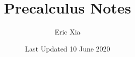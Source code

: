 \documentclass{article}
\title{Precalculus Notes}
\author{Eric Xia}
\date{Last Updated 10 June 2020}
\begin{document}
    \maketitle
    \tableofcontents
    \pagebreak

    
    
    
    
    
    
\end{document}
